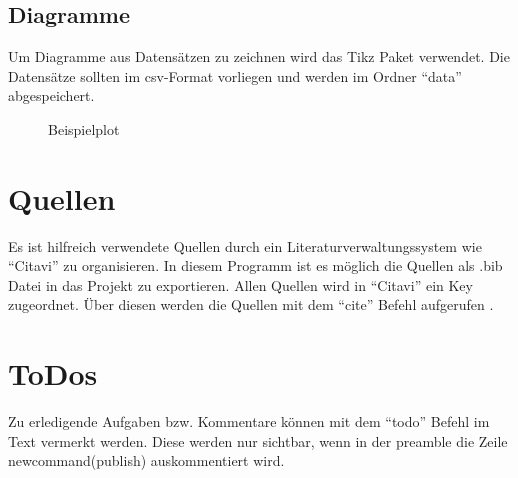\subsection{Diagramme}
Um Diagramme aus Datensätzen zu zeichnen wird das Tikz Paket verwendet. Die Datensätze sollten im csv-Format vorliegen und werden im Ordner "`data"' abgespeichert. 
\begin{figure}[ht]
	\centering
	\caption{Beispielplot}
	\label{tikz:beispielplot}
\end{figure}


\section{Quellen}
Es ist hilfreich verwendete Quellen durch ein Literaturverwaltungssystem wie "`Citavi"' zu organisieren. In diesem Programm ist es möglich die Quellen als .bib Datei in das Projekt zu exportieren. Allen Quellen wird in "`Citavi"' ein Key zugeordnet. Über diesen werden die Quellen mit dem "`cite"' Befehl aufgerufen \cite{thu}.

\section{ToDos}
Zu erledigende Aufgaben bzw. Kommentare können mit dem "`todo"' Befehl im Text vermerkt werden. Diese werden nur sichtbar, wenn in der preamble die Zeile {\selectfont newcommand(publish)} auskommentiert wird. 
